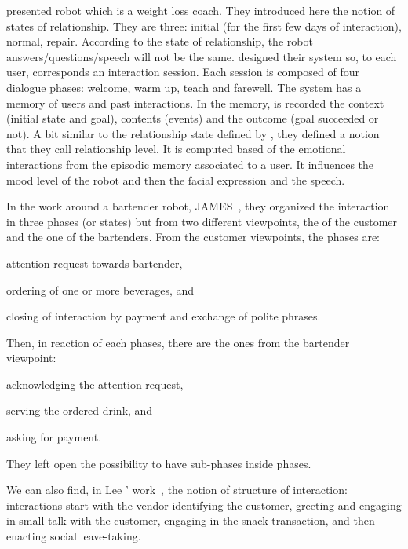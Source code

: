 \documentclass[a4paper,11pt,twoside]{StyleThese}
\begin{document}
\cite{kidd_2008_robots} presented robot which is a weight loss coach. They introduced here the notion of states of relationship. They are three: initial (for the first few days of interaction), normal, repair. According to the state of relationship, the robot answers/questions/speech will not be the same. \cite{kasap_2012_building} designed their system so, to each user, corresponds an interaction session. Each session is composed of four dialogue phases: welcome, warm up, teach and farewell. The system has a memory of users and past interactions. In the memory, is recorded the context (initial state and goal), contents (events) and the outcome (goal succeeded or not). A bit similar to the relationship state defined by \cite{kidd_2008_robots}, they defined a notion that they call relationship level. It is computed based of the emotional interactions from the episodic memory associated to a user. It influences the mood level of the robot and then the facial expression and the speech.

In the work around a bartender robot, JAMES~\citep{gaschler_2012_modelling}, they organized the interaction in three phases (or states) but from two different viewpoints, the of the customer and the one of the bartenders. From the customer viewpoints, the phases are: 
\begin{inlineEnumerate}
	\item attention request towards bartender,
	\item ordering of one or more beverages, and
	\item closing of interaction by payment and exchange of polite phrases.
\end{inlineEnumerate} Then, in reaction of each phases, there are the ones from the bartender viewpoint:
\begin{inlineEnumerate}
	\item acknowledging the attention request,
	\item serving the ordered drink, and
	\item asking for payment.
\end{inlineEnumerate}
They left open the possibility to have sub-phases inside phases.

We can also find, in Lee \etal{}' work~\citep{lee_2012_personalization}, the notion of structure of interaction: interactions start with the vendor identifying the customer, greeting and engaging in small talk with the customer, engaging in the snack transaction, and then enacting social leave-taking.
\end{document}
